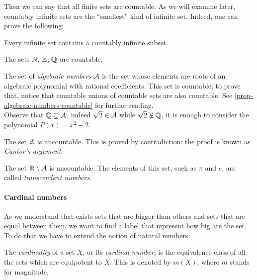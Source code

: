 Then we can say that all finite sets are countable. As we will examine later, countably infinite sets are the ``smallest'' kind of infinite set. Indeed, one can prove the following:
\begin{prop}
	Every infinite set contains a countably infinite subset.
\end{prop}

\begin{exam}
	The sets $\mathbb N$, $\mathbb Z$, $\mathbb Q$ are countable.
\end{exam}
\begin{exam}
	The set of \emph{algebraic numbers} $\mathcal A$ is the set whose elements are roots of an algebraic polynomial with rational coefficients. This set is countable; to prove that, notice that countable unions of countable sets are also countable. See \vref{prop-algebraic-numbers-countable} for further reading.\\
	Observe that $\mathbb Q \subsetneq \mathcal A$, indeed $\sqrt{2}\in \mathcal A$ while $\sqrt{2}\notin \mathbb Q$, it is enough to consider the polynomial $P(x)=x^2-2$.
\end{exam}
\begin{exam}
	The set $\mathbb R$ is uncountable. This is proved by contradiction: the proof is known as \textit{Cantor's argument}.
\end{exam}
\begin{exam}
	The set $\mathbb R \setminus \mathcal A$ is uncountable. The elements of this set, such as $\pi$ and $e$, are called \emph{transcendent numbers}.
\end{exam}

\paragraph{Cardinal numbers}

As we understand that exists sets that are bigger than others and sets that are equal between them, we want to find a label that represent how big are the set. To do that we have to extend the notion of natural numbers:

\begin{defn}
	The \emph{cardinality} of a set $X$, or its \emph{cardinal number}, is the equivalence class of all the sets which are equipotent to $X$.
	This is denoted by $m(X)$, where $m$ stands for magnitude.
\end{defn}

